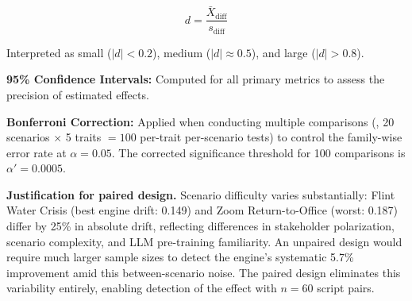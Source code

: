 \begin{equation}
    d = \frac{\bar{X}_{\text{diff}}}{s_{\text{diff}}}
    \label{eq:cohens_d}
\end{equation}

Interpreted as small ($|d| < 0.2$), medium ($|d| \approx 0.5$), and large ($|d| > 0.8$).

\textbf{95\% Confidence Intervals:} Computed for all primary metrics to assess the precision of estimated effects.

\textbf{Bonferroni Correction:} Applied when conducting multiple comparisons (\eg, 20 scenarios $\times$ 5 traits $= 100$ per-trait per-scenario tests) to control the family-wise error rate at $\alpha = 0.05$. The corrected significance threshold for 100 comparisons is $\alpha' = 0.0005$.

\textbf{Justification for paired design.} Scenario difficulty varies substantially: Flint Water Crisis (best engine drift: 0.149) and Zoom Return-to-Office (worst: 0.187) differ by 25\% in absolute drift, reflecting differences in stakeholder polarization, scenario complexity, and LLM pre-training familiarity. An unpaired design would require much larger sample sizes to detect the engine's systematic 5.7\% improvement amid this between-scenario noise. The paired design eliminates this variability entirely, enabling detection of the effect with $n=60$ script pairs.
